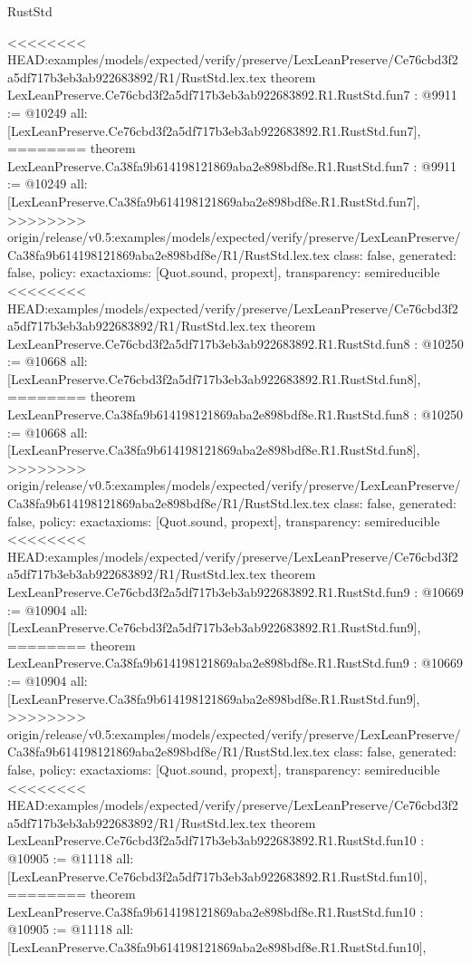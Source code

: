 \begin{lexlean}{RustStd}
\begin{coremodule}
{\begin{coremodule}
{{{{{{{{{{}
<<<<<<<< HEAD:examples/models/expected/verify/preserve/LexLeanPreserve/Ce76cbd3f2a5df717b3eb3ab922683892/R1/RustStd.lex.tex
theorem LexLeanPreserve.Ce76cbd3f2a5df717b3eb3ab922683892.R1.RustStd.fun7 : @9911 := @10249 {
  all: [LexLeanPreserve.Ce76cbd3f2a5df717b3eb3ab922683892.R1.RustStd.fun7],
========
theorem LexLeanPreserve.Ca38fa9b614198121869aba2e898bdf8e.R1.RustStd.fun7 : @9911 := @10249 {
  all: [LexLeanPreserve.Ca38fa9b614198121869aba2e898bdf8e.R1.RustStd.fun7],
>>>>>>>> origin/release/v0.5:examples/models/expected/verify/preserve/LexLeanPreserve/Ca38fa9b614198121869aba2e898bdf8e/R1/RustStd.lex.tex
  class: false,
  generated: false,
  policy: exact{axioms: [Quot.sound, propext]},
  transparency: semireducible
}
<<<<<<<< HEAD:examples/models/expected/verify/preserve/LexLeanPreserve/Ce76cbd3f2a5df717b3eb3ab922683892/R1/RustStd.lex.tex
theorem LexLeanPreserve.Ce76cbd3f2a5df717b3eb3ab922683892.R1.RustStd.fun8 : @10250 := @10668 {
  all: [LexLeanPreserve.Ce76cbd3f2a5df717b3eb3ab922683892.R1.RustStd.fun8],
========
theorem LexLeanPreserve.Ca38fa9b614198121869aba2e898bdf8e.R1.RustStd.fun8 : @10250 := @10668 {
  all: [LexLeanPreserve.Ca38fa9b614198121869aba2e898bdf8e.R1.RustStd.fun8],
>>>>>>>> origin/release/v0.5:examples/models/expected/verify/preserve/LexLeanPreserve/Ca38fa9b614198121869aba2e898bdf8e/R1/RustStd.lex.tex
  class: false,
  generated: false,
  policy: exact{axioms: [Quot.sound, propext]},
  transparency: semireducible
}
<<<<<<<< HEAD:examples/models/expected/verify/preserve/LexLeanPreserve/Ce76cbd3f2a5df717b3eb3ab922683892/R1/RustStd.lex.tex
theorem LexLeanPreserve.Ce76cbd3f2a5df717b3eb3ab922683892.R1.RustStd.fun9 : @10669 := @10904 {
  all: [LexLeanPreserve.Ce76cbd3f2a5df717b3eb3ab922683892.R1.RustStd.fun9],
========
theorem LexLeanPreserve.Ca38fa9b614198121869aba2e898bdf8e.R1.RustStd.fun9 : @10669 := @10904 {
  all: [LexLeanPreserve.Ca38fa9b614198121869aba2e898bdf8e.R1.RustStd.fun9],
>>>>>>>> origin/release/v0.5:examples/models/expected/verify/preserve/LexLeanPreserve/Ca38fa9b614198121869aba2e898bdf8e/R1/RustStd.lex.tex
  class: false,
  generated: false,
  policy: exact{axioms: [Quot.sound, propext]},
  transparency: semireducible
}
<<<<<<<< HEAD:examples/models/expected/verify/preserve/LexLeanPreserve/Ce76cbd3f2a5df717b3eb3ab922683892/R1/RustStd.lex.tex
theorem LexLeanPreserve.Ce76cbd3f2a5df717b3eb3ab922683892.R1.RustStd.fun10 : @10905 := @11118 {
  all: [LexLeanPreserve.Ce76cbd3f2a5df717b3eb3ab922683892.R1.RustStd.fun10],
========
theorem LexLeanPreserve.Ca38fa9b614198121869aba2e898bdf8e.R1.RustStd.fun10 : @10905 := @11118 {
  all: [LexLeanPreserve.Ca38fa9b614198121869aba2e898bdf8e.R1.RustStd.fun10],
}}}}}}}}}}}}}}
\end{coremodule}}
\end{coremodule}
\end{lexlean}
